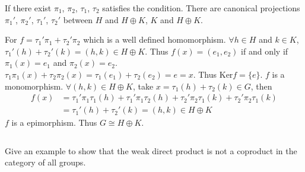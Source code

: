 \begin{answer}
    If there exist $\pi_{1}$, $\pi_{2}$, $\tau_{1}$, $\tau_{2}$ satisfies the condition. There are canonical projections $\pi_{1}'$, $\pi_{2}'$, $\tau_{1}'$, $\tau_{2}'$ between $H$ and $H\oplus K$, $K$ and $H\oplus K$.

    \begin{figure}[H]\centering
    \end{figure}
    For $f=\tau_{1}'\pi_{1}+\tau_{2}'\pi_{2}$ which is a well defined homomorphism. $\forall h\in H$ and $k\in K$, $\tau_{1}'(h)+\tau_{2}'(k)=(h,k)\in H\oplus K$. Thus $f(x)=(e_{1},e_{2})$ if and only if $\pi_{1}(x)=e_{1}$ and $\pi_{2}(x)=e_{2}$. $\tau_{1}\pi_{1}(x)+\tau_{2}\pi_{2}(x)=\tau_{1}(e_{1})+\tau_{2}(e_{2})=e=x$. Thus $\mathrm{Ker}f=\{e\}$. $f$ is a monomorphism. $\forall (h,k)\in H\oplus K$, take $x=\tau_{1}(h)+\tau_{2}(k)\in G$, then \[\begin{aligned}
        f(x)&=\tau_{1}'\pi_{1}\tau_{1}(h)+\tau_1'\pi_{1}\tau_{2}(h)+\tau_{2}'\pi_{2}\tau_{1}(k)+\tau_{2}'\pi_{2}\tau_{1}(k)\\&=\tau_{1}'(h)+\tau_{2}'(k)=(h,k)\in H\oplus K
    \end{aligned}\]
    $f$ is a epimorphism. Thus $G\cong H\oplus K$.
\end{answer}

$$ $$

\begin{ex}
    Give an example to show that the weak direct product is not a coproduct in the category of all groups.
\end{ex}

